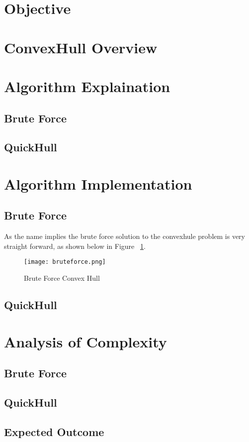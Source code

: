 \documentclass{article}
\begin{document}

\tableofcontents{}
{
  \section{Objective}
  \section{ConvexHull Overview}
  \section{Algorithm Explaination}
  \subsection{Brute Force}
  \subsection{QuickHull}
  \section{Algorithm Implementation}
  \subsection{Brute Force}
  As the name implies the brute force solution to the convexhule problem is very straight forward, as shown below in Figure ~\ref{fig:bruteforce}.
  \begin{figure}
    \texttt{[image: bruteforce.png]}
    \caption{Brute Force Convex Hull}
    \label{fig:bruteforce}
\end{figure}
  \subsection{QuickHull}
  \section{Analysis of Complexity}
  \subsection{Brute Force}
  \subsection{QuickHull}
  \subsection{Expected Outcome}
}
\end{document}
